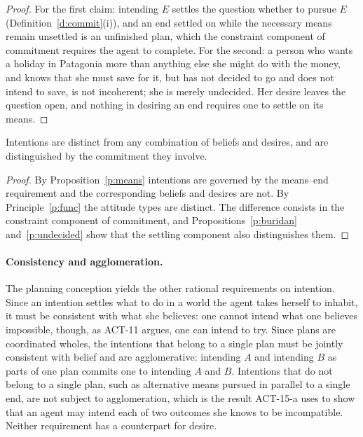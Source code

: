 \documentclass{situationist-preprint}
\begin{document}
\begin{proof}
For the first claim: intending $E$ settles the question whether to pursue $E$ (Definition~\ref{d:commit}(i)), and an end settled on while the necessary means remain unsettled is an unfinished plan, which the constraint component of commitment requires the agent to complete. For the second: a person who wants a holiday in Patagonia more than anything else she might do with the money, and knows that she must save for it, but has not decided to go and does not intend to save, is not incoherent; she is merely undecided. Her desire leaves the question open, and nothing in desiring an end requires one to settle on its means.
\end{proof}

\begin{corollary}\label{c:distinct}
Intentions are distinct from any combination of beliefs and desires, and are distinguished by the commitment they involve.
\end{corollary}

\begin{proof}
By Proposition~\ref{p:means} intentions are governed by the means--end requirement and the corresponding beliefs and desires are not. By Principle~\ref{p:func} the attitude types are distinct. The difference consists in the constraint component of commitment, and Propositions~\ref{p:buridan} and~\ref{p:undecided} show that the settling component also distinguishes them.
\end{proof}

\paragraph{Consistency and agglomeration.} The planning conception yields the other rational requirements on intention. Since an intention settles what to do in a world the agent takes herself to inhabit, it must be consistent with what she believes: one cannot intend what one believes impossible, though, as ACT-11 argues, one can intend to try. Since plans are coordinated wholes, the intentions that belong to a single plan must be jointly consistent with belief and are agglomerative: intending $A$ and intending $B$ as parts of one plan commits one to intending $A$ and $B$. Intentions that do not belong to a single plan, such as alternative means pursued in parallel to a single end, are not subject to agglomeration, which is the result ACT-15-a uses to show that an agent may intend each of two outcomes she knows to be incompatible. Neither requirement has a counterpart for desire.
\end{document}
